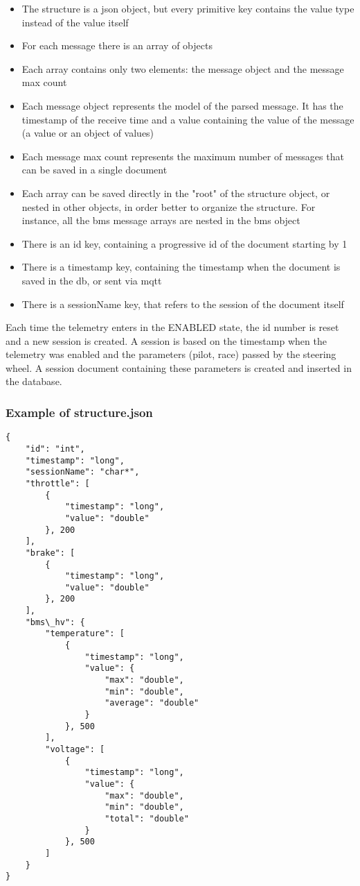 \begin{itemize}
    \item The structure is a json object, but every primitive key contains the value type instead of the value itself
    \item For each message there is an array of objects
    \item Each array contains only two elements: the message object and the message max count
    \item Each message object represents the model of the parsed message. It has the timestamp of the receive time and a value containing the value of the message (a value or an object of values)
    \item Each message max count represents the maximum number of messages that can be saved in a single document
    \item Each array can be saved directly in the "root" of the structure object, or nested in other objects, in order better to organize the structure. For instance, all the bms message arrays are nested in the bms object
    \item There is an id key, containing a progressive id of the document starting by 1
    \item There is a timestamp key, containing the timestamp when the document is saved in the db, or sent via mqtt
    \item There is a sessionName key, that refers to the session of the document itself
\end{itemize}

Each time the telemetry enters in the ENABLED state, the id number is reset and a new session is created.
A session is based on the timestamp when the telemetry was enabled and the parameters (pilot, race) passed by the steering wheel. 
A session document containing these parameters is created and inserted in the database.

\subsubsection{Example of structure.json}

\begin{verbatim}
{
    "id": "int",
    "timestamp": "long",
    "sessionName": "char*",
    "throttle": [
        {
            "timestamp": "long",
            "value": "double"
        }, 200
    ],
    "brake": [
        {
            "timestamp": "long",
            "value": "double"
        }, 200
    ],
    "bms\_hv": {
        "temperature": [
            {
                "timestamp": "long",
                "value": {
                    "max": "double",
                    "min": "double",
                    "average": "double"
                }
            }, 500
        ],
        "voltage": [
            {
                "timestamp": "long",
                "value": {
                    "max": "double",
                    "min": "double",
                    "total": "double"
                }
            }, 500
        ]
    }
}
\end{verbatim}

